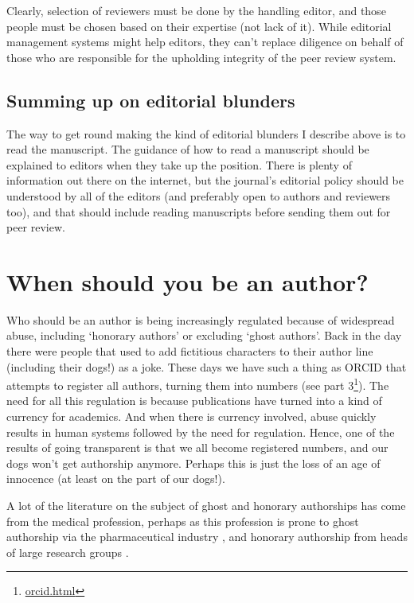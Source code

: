 \documentclass[
]{krantz}
\renewcommand{\href}[2]{#2\footnote{\url{#1}}}
\begin{document}
Clearly, selection of reviewers must be done by the handling editor, and those people must be chosen based on their expertise (not lack of it). While editorial management systems might help editors, they can't replace diligence on behalf of those who are responsible for the upholding integrity of the peer review system.

\hypertarget{summing-up-on-editorial-blunders}{%
\section{Summing up on editorial blunders}\label{summing-up-on-editorial-blunders}}

The way to get round making the kind of editorial blunders I describe above is to read the manuscript. The guidance of how to read a manuscript should be explained to editors when they take up the position. There is plenty of information out there on the internet, but the journal's editorial policy should be understood by all of the editors (and preferably open to authors and reviewers too), and that should include reading manuscripts before sending them out for peer review.

\hypertarget{authors}{%
\chapter{When should you be an author?}\label{authors}}

Who should be an author is being increasingly regulated because of widespread abuse, including `honorary authors' or excluding `ghost authors'. Back in the day there were people that used to add fictitious characters to their author line (including their dogs!) as a joke. These days we have such a thing as ORCID that attempts to register all authors, turning them into numbers (\href{orcid.html}{see part 3}). The need for all this regulation is because publications have turned into a kind of currency for academics. And when there is currency involved, abuse quickly results in human systems followed by the need for regulation. Hence, one of the results of going transparent is that we all become registered numbers, and our dogs won't get authorship anymore. Perhaps this is just the loss of an age of innocence (at least on the part of our dogs!).

A lot of the literature on the subject of ghost and honorary authorships has come from the medical profession, perhaps as this profession is prone to ghost authorship via the pharmaceutical industry \citep{matheson2016ghostwriting}, and honorary authorship from heads of large research groups \citep[see][]{rennie1994authorship}.
\end{document}
